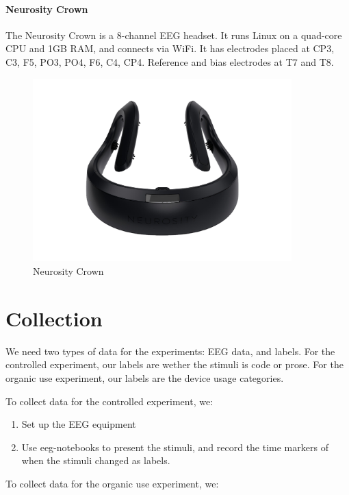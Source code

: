     \begin{minipage}{\textwidth}
        \paragraph*{Neurosity Crown}
        The Neurosity Crown is a 8-channel EEG headset. It runs Linux on a quad-core CPU and 1GB RAM, and connects via WiFi. It has electrodes placed at CP3, C3, F5, PO3, PO4, F6, C4, CP4. Reference and bias electrodes at T7 and T8.

        \begin{figure}[H]
            \centering
            \includegraphics[trim=0 100 0 100,clip,width=100mm]{img/crown-1.png}
            \caption{Neurosity Crown}\label{fig:crown}
        \end{figure}
    \end{minipage}

\pagebreak
\section{Collection}

We need two types of data for the experiments: EEG data, and labels. For the controlled experiment, our labels are wether the stimuli is code or prose. For the organic use experiment, our labels are the device usage categories.

To collect data for the controlled experiment, we:

\begin{enumerate}
    \item Set up the EEG equipment
    \item Use eeg-notebooks to present the stimuli, and record the time markers of when the stimuli changed as labels.
\end{enumerate}

To collect data for the organic use experiment, we:

